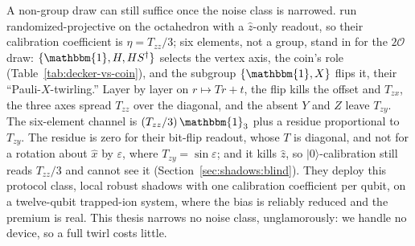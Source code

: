 \documentclass[11pt, oneside, openany]{scrbook}
\newcommand{\Id}{\mathbbm{1}}
\newcommand{\Tgroup}{\mathcal{T}}  %
\newcommand{\Ogroup}{\mathcal{O}}  %
\newcommand{\TwoO}{2\Ogroup}
\newcommand{\ket}[1]{|#1\rangle}
\begin{document}
A non-group draw can still suffice once the noise class is narrowed. \textcite{wilkens2026localrobustshadowsa} run randomized-projective on the octahedron with a $\hat z$-only readout, so their calibration coefficient is $\eta = T_{zz}/3$; six elements, not a group, stand in for the $\TwoO$ draw: $\{\Id, H, HS^\dagger\}$ selects the vertex axis, the coin's role (Table~\ref{tab:decker-vs-coin}), and the subgroup $\{\Id, X\}$ flips it, their ``Pauli-$X$-twirling.'' Layer by layer on $r \mapsto Tr + t$, the flip kills the offset and $T_{zx}$, the three axes spread $T_{zz}$ over the diagonal, and the absent $Y$ and $Z$ leave $T_{zy}$. The six-element channel is $(T_{zz}/3)\,\Id_3$ plus a residue proportional to $T_{zy}$. The residue is zero for their bit-flip readout, whose $T$ is diagonal, and not for a rotation about $\hat x$ by $\varepsilon$, where $T_{zy} = \sin\varepsilon$; and it kills $\hat z$, so $\ket{0}$-calibration still reads $T_{zz}/3$ and cannot see it (Section~\ref{sec:shadows:blind}). They deploy this protocol class, local robust shadows with one calibration coefficient per qubit, on a twelve-qubit trapped-ion system, where the bias is reliably reduced and the premium is real. This thesis narrows no noise class, unglamorously: we handle no device, so a full twirl costs little.
\end{document}
